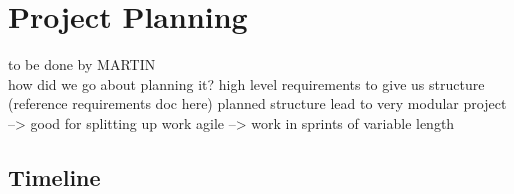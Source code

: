 \section{Project Planning}
to be done by MARTIN\\
how did we go about planning it?
high level requirements to give us structure (reference requirements doc here)
planned structure lead to very modular project --> good for splitting up work
agile --> work in sprints of variable length
\subsection{Timeline}
